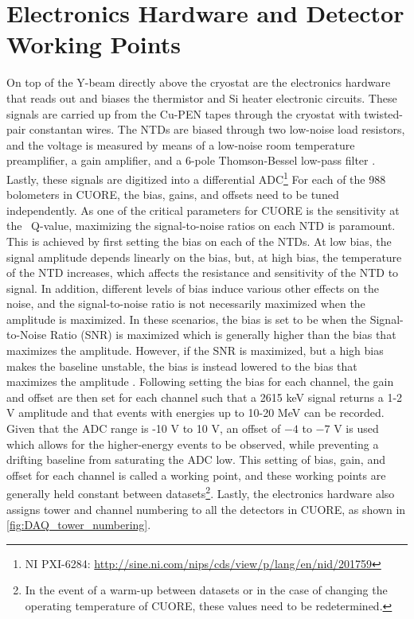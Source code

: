 \section{Electronics Hardware and Detector Working Points}
\label{sec:Electronics Hardware}
On top of the Y-beam directly above the cryostat are the electronics hardware that reads out and biases the thermistor and Si heater electronic circuits.
These signals are carried up from the Cu-PEN tapes through the cryostat with twisted-pair constantan wires.
The NTDs are biased through two low-noise load resistors, and the voltage is measured by means of a low-noise room temperature preamplifier, a gain amplifier, and a 6-pole Thomson-Bessel low-pass filter \cite{doi:10.1063/1.4936269, PESSINA2000132, ARNABOLDI2010327}.
Lastly, these signals are digitized into a differential ADC\footnote{\RaggedRight NI PXI-6284: \url{http://sine.ni.com/nips/cds/view/p/lang/en/nid/201759}}
For each of the 988 bolometers in CUORE, the bias, gains, and offsets need to be tuned independently.
As one of the critical parameters for CUORE is the sensitivity at the \zeronubb~Q-value, maximizing the signal-to-noise ratios on each NTD is paramount.
This is achieved by first setting the bias on each of the NTDs.
At low bias, the signal amplitude depends linearly on the bias, but, at high bias, the temperature of the NTD increases, which affects the resistance and sensitivity of the NTD to signal.
In addition, different levels of bias induce various other effects on the noise, and the signal-to-noise ratio is not necessarily maximized when the amplitude is maximized.
In these scenarios, the bias is set to be when the Signal-to-Noise Ratio (SNR) is maximized which is generally higher than the bias that maximizes the amplitude.
However, if the SNR is maximized, but a high bias makes the baseline unstable, the bias is instead lowered to the bias that maximizes the amplitude \cite{Lucia:LoadCurvesDoc}.
Following setting the bias for each channel, the gain and offset are then set for each channel such that a 2615 keV signal returns a 1-2 V amplitude and that events with energies up to 10-20 MeV can be recorded.
Given that the ADC range is -10 V to 10 V, an offset of $-4$ to $-7$ V is used which allows for the higher-energy events to be observed, while preventing a drifting baseline from saturating the ADC low.
This setting of bias, gain, and offset for each channel is called a working point, and these working points are generally held constant between datasets\footnote{In the event of a warm-up between datasets or in the case of changing the operating temperature of CUORE, these values need to be redetermined.}.
Lastly, the electronics hardware also assigns tower and channel numbering to all the detectors in CUORE, as shown in \autoref{fig:DAQ_tower_numbering}.

